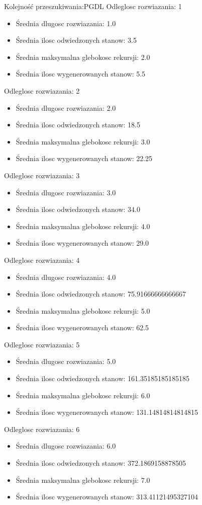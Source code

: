 \documentclass{classrep}
\begin{document}
				Kolejność przeszukiwania:PGDL
				Odleglosc rozwiazania: 1
				\begin{itemize}
					\item Średnia dlugosc rozwiazania: 1.0
					\item Średnia ilosc odwiedzonych stanow: 3.5
					\item Średnia maksymalna glebokosc rekursji: 2.0
					\item Średnia ilosc wygenerowanych stanow: 5.5
				\end{itemize}
				Odleglosc rozwiazania: 2
				\begin{itemize}
					\item Średnia dlugosc rozwiazania: 2.0
					\item Średnia ilosc odwiedzonych stanow: 18.5
					\item Średnia maksymalna glebokosc rekursji: 3.0
					\item Średnia ilosc wygenerowanych stanow: 22.25
				\end{itemize}
				Odleglosc rozwiazania: 3
				\begin{itemize}
					\item Średnia dlugosc rozwiazania: 3.0
					\item Średnia ilosc odwiedzonych stanow: 34.0
					\item Średnia maksymalna glebokosc rekursji: 4.0
					\item Średnia ilosc wygenerowanych stanow: 29.0
				\end{itemize}
				Odleglosc rozwiazania: 4
				\begin{itemize}
					\item Średnia dlugosc rozwiazania: 4.0
					\item Średnia ilosc odwiedzonych stanow: 75.91666666666667
					\item Średnia maksymalna glebokosc rekursji: 5.0
					\item Średnia ilosc wygenerowanych stanow: 62.5
				\end{itemize}
				Odleglosc rozwiazania: 5
				\begin{itemize}
					\item Średnia dlugosc rozwiazania: 5.0
					\item Średnia ilosc odwiedzonych stanow: 161.35185185185185
					\item Średnia maksymalna glebokosc rekursji: 6.0
					\item Średnia ilosc wygenerowanych stanow: 131.14814814814815
				\end{itemize}
				Odleglosc rozwiazania: 6
				\begin{itemize}
					\item Średnia dlugosc rozwiazania: 6.0
					\item Średnia ilosc odwiedzonych stanow: 372.1869158878505
					\item Średnia maksymalna glebokosc rekursji: 7.0
					\item Średnia ilosc wygenerowanych stanow: 313.41121495327104
				\end{itemize}
				
\end{document}
